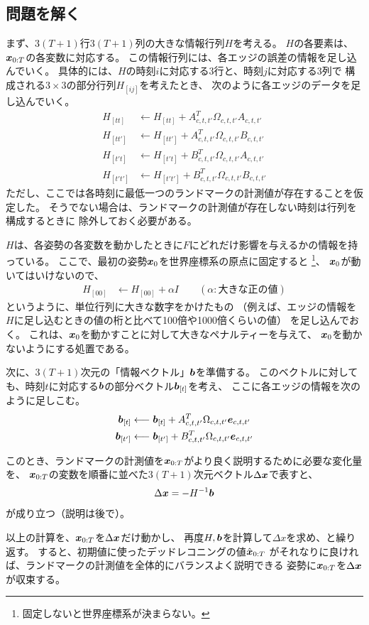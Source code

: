 \subsection{問題を解く}


まず、$3(T+1)$行$3(T+1)$列の大きな情報行列$H$を考える。
$H$の各要素は、$\boldsymbol{x}_{0:T}$の各変数に対応する。
この情報行列には、各エッジの誤差の情報を足し込んでいく。
具体的には、$H$の時刻$i$に対応する3行と、時刻$j$に対応する3列で
構成される$3\times3$の部分行列$H_{[ij]}$を考えたとき、
次のように各エッジのデータを足し込んでいく。
\begin{align}
	H_{[tt]} &\longleftarrow H_{[tt]} + A_{c,t,t'}^T \Omega_{c,t,t'} A_{c,t,t'} \\
	H_{[tt']} &\longleftarrow H_{[tt']} + A_{c,t,t'}^T \Omega_{c,t,t'} B_{c,t,t'} \\
	H_{[t't]} &\longleftarrow H_{[t't]} + B_{c,t,t'}^T \Omega_{c,t,t'} A_{c,t,t'} \\
	H_{[t't']} &\longleftarrow H_{[t't']} + B_{c,t,t'}^T \Omega_{c,t,t'} B_{c,t,t'}
\end{align}
ただし、ここでは各時刻に最低一つのランドマークの計測値が存在することを仮定した。
そうでない場合は、ランドマークの計測値が存在しない時刻は行列を構成するときに
除外しておく必要がある。

$H$は、各姿勢の各変数を動かしたときに$F$にどれだけ影響を与えるかの情報を持っている。
ここで、最初の姿勢$\boldsymbol{x}_0$を世界座標系の原点に固定すると
\footnote{固定しないと世界座標系が決まらない。}、
$\boldsymbol{x}_0$が動いてはいけないので、
\begin{align}
	H_{[00]} &\longleftarrow H_{[00]} + \alpha I \qquad (\alpha: \text{大きな正の値})
\end{align}
というように、単位行列に大きな数字をかけたもの
（例えば、エッジの情報を$H$に足し込むときの値の桁と比べて100倍や1000倍くらいの値）
を足し込んでおく。
これは、$\boldsymbol{x}_0$を動かすことに対して大きなペナルティーを与えて、
$\boldsymbol{x}_0$を動かないようにする処置である。



次に、$3(T+1)$次元の「情報ベクトル」$\boldsymbol{b}$を準備する。
このベクトルに対しても、時刻$t$に対応する$\boldsymbol{b}$の部分ベクトル$\boldsymbol{b}_{[t]}$を考え、
ここに各エッジの情報を次のように足しこむ。
\begin{align}
	\boldsymbol{b}_{[t]} &\longleftarrow \boldsymbol{b}_{[t]} + A_{c,t,t'}^T \Omega_{c,t,t'} \boldsymbol{e}_{c,t,t'} \\
	\boldsymbol{b}_{[t']} &\longleftarrow \boldsymbol{b}_{[t']} + B_{c,t,t'}^T \Omega_{c,t,t'} \boldsymbol{e}_{c,t,t'} 
\end{align}


このとき、ランドマークの計測値を$\boldsymbol{x}_{0:T}$がより良く説明するために必要な変化量を、
$\boldsymbol{x}_{0:T}$の変数を順番に並べた$3(T+1)$次元ベクトル$\Delta\boldsymbol{x}$で表すと、
\begin{align}
	\Delta\boldsymbol{x} = - H^{-1}\boldsymbol{b}
\end{align}
が成り立つ（説明は後で）。

以上の計算を、$\boldsymbol{x}_{0:T}$を$\Delta\boldsymbol{x}$だけ動かし、
再度$H, \boldsymbol{b}$を計算して$\Delta{x}$を求め、と繰り返す。
すると、初期値に使ったデッドレコニングの値$\hat{\boldsymbol{x}}_{0:T}$
がそれなりに良ければ、ランドマークの計測値を全体的にバランスよく説明できる
姿勢に$\boldsymbol{x}_{0:T}$を$\Delta\boldsymbol{x}$が収束する。

